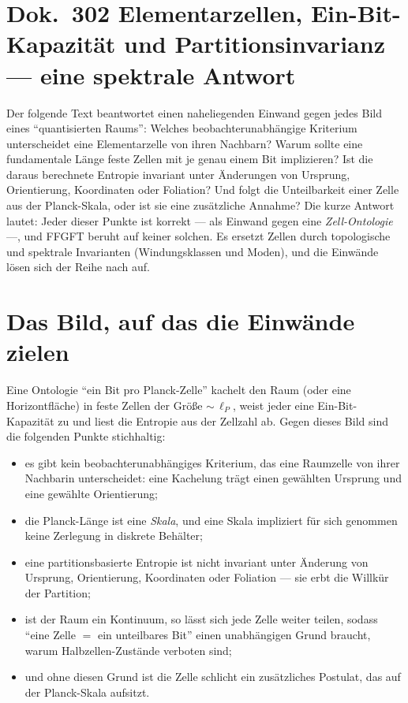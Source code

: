 
\section*{Dok.~302 \quad Elementarzellen, Ein-Bit-Kapazität und Partitionsinvarianz ---
eine spektrale Antwort}

Der folgende Text beantwortet einen naheliegenden Einwand gegen jedes Bild eines
\enquote{quantisierten Raums}: Welches beobachterunabhängige Kriterium unterscheidet
eine Elementarzelle von ihren Nachbarn? Warum sollte eine fundamentale Länge feste
Zellen mit je genau einem Bit implizieren? Ist die daraus berechnete Entropie
invariant unter Änderungen von Ursprung, Orientierung, Koordinaten oder Foliation?
Und folgt die Unteilbarkeit einer Zelle aus der Planck-Skala, oder ist sie eine
zusätzliche Annahme? Die kurze Antwort lautet: Jeder dieser Punkte ist korrekt --- als
Einwand gegen eine \emph{Zell-Ontologie} ---, und FFGFT beruht auf keiner solchen. Es
ersetzt Zellen durch topologische und spektrale Invarianten (Windungsklassen und Moden), und die Einwände lösen sich der Reihe nach auf.

\section{Das Bild, auf das die Einwände zielen}

Eine Ontologie \enquote{ein Bit pro Planck-Zelle} kachelt den Raum (oder eine
Horizontfläche) in feste Zellen der Größe ${\sim}\,\ell_P$, weist jeder eine
Ein-Bit-Kapazität zu und liest die Entropie aus der Zellzahl ab. Gegen dieses Bild
sind die folgenden Punkte stichhaltig:

\begin{itemize}
\item es gibt kein beobachterunabhängiges Kriterium, das eine Raumzelle von ihrer
Nachbarin unterscheidet: eine Kachelung trägt einen gewählten Ursprung und eine
gewählte Orientierung;
\item die Planck-Länge ist eine \emph{Skala}, und eine Skala impliziert für sich
genommen keine Zerlegung in diskrete Behälter;
\item eine partitionsbasierte Entropie ist nicht invariant unter Änderung von
Ursprung, Orientierung, Koordinaten oder Foliation --- sie erbt die Willkür der
Partition;
\item ist der Raum ein Kontinuum, so lässt sich jede Zelle weiter teilen, sodass
\enquote{eine Zelle $=$ ein unteilbares Bit} einen unabhängigen Grund braucht, warum
Halbzellen-Zustände verboten sind;
\item und ohne diesen Grund ist die Zelle schlicht ein zusätzliches Postulat, das
auf der Planck-Skala aufsitzt.
\end{itemize}

